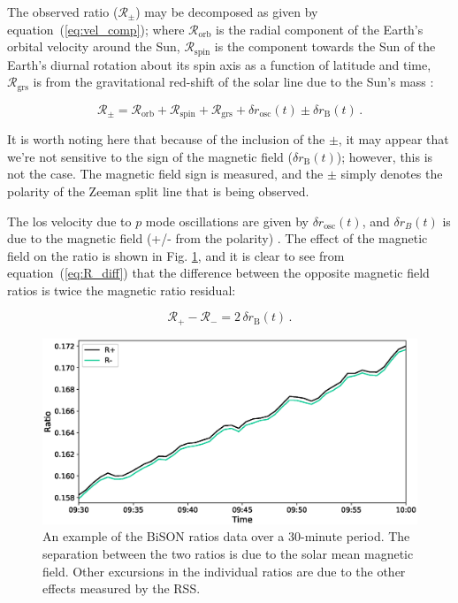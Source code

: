 The observed ratio ($\mathcal{R}_{\pm}$) may be decomposed as given by equation~(\ref{eq:vel_comp}); where $\mathcal{R}_{\mathrm{orb}}$ is the radial component of the Earth's orbital velocity around the Sun, $\mathcal{R}_{\mathrm{spin}}$ is the component towards the Sun of the Earth's diurnal rotation about its spin axis as a function of latitude and time, $\mathcal{R}_{\mathrm{grs}}$ is from the gravitational red-shift of the solar line due to the Sun's mass \citep{elsworth_techniques_1995, dumbill_observation_1999}:

\begin{equation}
\mathcal{R}_{\pm} = \mathcal{R}_{\mathrm{orb}} + \mathcal{R}_{\mathrm{spin}} + \mathcal{R}_{\mathrm{grs}} + \delta {r}_{\mathrm{osc}}(t) \pm \delta {r}_{\mathrm{B}}(t) \, .
\label{eq:vel_comp}
\end{equation}

It is worth noting here that because of the inclusion of the $\pm$, it may appear that we're not sensitive to the sign of the magnetic field ($\delta {r}_{\mathrm{B}}(t)$); however, this is not the case. The magnetic field sign is measured, and the $\pm$ simply denotes the polarity of the Zeeman split line that is being observed.

The \gls{los} velocity due to $p$ mode oscillations are given by $\delta {r}_{\mathrm{osc}}(t)$, and $\delta {r}_B(t)$ is due to the magnetic field (+/- from the polarity) \citep{dumbill_observation_1999}. The effect of the magnetic field on the ratio is shown in Fig. \ref{fig:ratio_split}, and it is clear to see from equation~(\ref{eq:R_diff}) that the difference between the opposite magnetic field ratios is twice the magnetic ratio residual:

\begin{equation}
\mathcal{R}_{+} - \mathcal{R}_{-} = 2 \, \delta {r}_{\mathrm{B}}(t) \, .
\label{eq:R_diff}
\end{equation}

\begin{figure}[ht!]
	\includegraphics[width=\columnwidth]{Fred_ratio_zoom.eps}
	\caption{An example of the BiSON ratios data over a 30-minute period. The separation between the two ratios is due to the solar mean magnetic field. Other excursions in the individual ratios are due to the other effects measured by the RSS.}
	\label{fig:ratio_split}
\end{figure}

